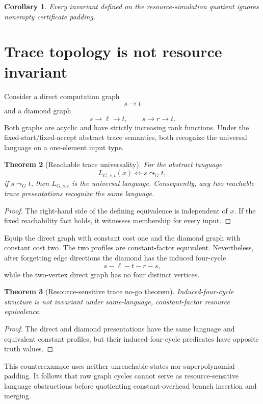 \documentclass[11pt]{article}
\newtheorem{theorem}{Theorem}[section]
\newtheorem{corollary}[theorem]{Corollary}
\theoremstyle{definition}
\begin{document}
\begin{corollary}
Every invariant defined on the resource-simulation quotient ignores nonempty
certificate padding.
\end{corollary}

\section{Trace topology is not resource invariant}

Consider a direct computation graph
\[
  s\longrightarrow t
\]
and a diamond graph
\[
  s\longrightarrow \ell\longrightarrow t,
  \qquad
  s\longrightarrow r\longrightarrow t.
\]
Both graphs are acyclic and have strictly increasing rank functions.  Under
the fixed-start/fixed-accept abstract trace semantics, both recognize the
universal language on a one-element input type.

\begin{theorem}[Reachable trace universality]
For the abstract language
\[
  L_{G,s,t}(x)\iff s\leadsto_G t,
\]
if \(s\leadsto_G t\), then \(L_{G,s,t}\) is the universal language.
Consequently, any two reachable trace presentations recognize the same
language.
\end{theorem}

\begin{proof}
The right-hand side of the defining equivalence is independent of \(x\).  If
the fixed reachability fact holds, it witnesses membership for every input.
\end{proof}

Equip the direct graph with constant cost one and the diamond graph with
constant cost two.  The two profiles are constant-factor equivalent.
Nevertheless, after forgetting edge directions the diamond has the induced
four-cycle
\[
  s-\ell-t-r-s,
\]
while the two-vertex direct graph has no four distinct vertices.

\begin{theorem}[Resource-sensitive trace no-go theorem]
Induced-four-cycle structure is not invariant under same-language,
constant-factor resource equivalence.
\end{theorem}

\begin{proof}
The direct and diamond presentations have the same language and equivalent
constant profiles, but their induced-four-cycle predicates have opposite
truth values.
\end{proof}

This counterexample uses neither unreachable states nor superpolynomial
padding.  It follows that raw graph cycles cannot serve as resource-sensitive
language obstructions before quotienting constant-overhead branch insertion
and merging.
\end{document}
